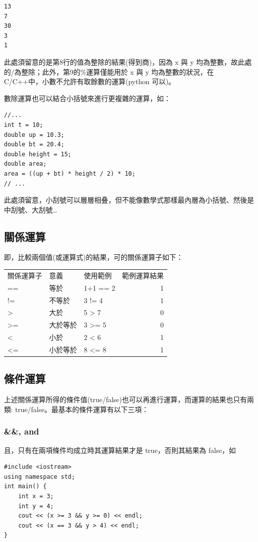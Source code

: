 \documentclass[12pt,a4paper]{article}
\begin{document}
\begin{verbatim}
13
7
30
3
1
\end{verbatim}


此處須留意的是第8行的值為整除的結果(得到商)，因為 x 與 y 均為整數，故此處的/為整除；此外，第9的\%運算僅能用於 x 與 y 均為整數的狀況，在 C/C++中，小數不允許有取餘數的運算(python 可以)。

數除運算也可以結合小括號來進行更複雜的運算，如：
\lstset{breaklines=true,language=cpp,label= ,caption= ,captionpos=b,firstnumber=1,numbers=left}
\begin{lstlisting}
//...
int t = 10;
double up = 10.3;
double bt = 20.4;
double height = 15;
double area;
area = ((up + bt) * height / 2) * 10;
// ...
\end{lstlisting}

此處須留意，小刮號可以層層相叠，但不能像數學式那樣最內層為小括號、然後是中刮號、大刮號\ldots{}

\subsection{關係運算}
\label{cpp_cond_operation}
即，比較兩個值(或運算式)的結果，可的關係運算子如下：
\begin{center}
\begin{tabular}{lllr}
關係運算子 & 意義 & 使用範例 & 範例運算結果\\
== & 等於 & 1+1 == 2 & 1\\
!= & 不等於 & 3 != 4 & 1\\
> & 大於 & 5 > 7 & 0\\
>= & 大於等於 & 3 >= 5 & 0\\
< & 小於 & 2 < 6 & 1\\
<= & 小於等於 & 8 <= 8 & 1\\
\end{tabular}
\end{center}

\subsection{條件運算}
\label{sec:org121f49b}
上述關係運算所得的條件值(true/false)也可以再進行運算，而運算的結果也只有兩類: true/false。最基本的條件運算有以下三項：
\subsubsection{\&\&, and}
\label{sec:org4be4141}
且，只有在兩項條件均成立時其運算結果才是 true，否則其結果為 false，如
\lstset{breaklines=true,language=cpp,label= ,caption= ,captionpos=b,firstnumber=1,numbers=left}
\begin{lstlisting}
#include <iostream>
using namespace std;
int main() {
    int x = 3;
    int y = 4;
    cout << (x >= 3 && y >= 0) << endl;
    cout << (x == 3 && y > 4) << endl;
}
\end{lstlisting}
\end{document}
